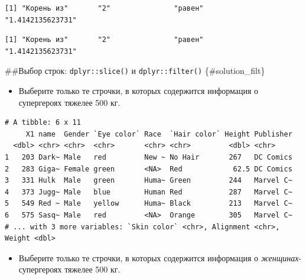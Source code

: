 \documentclass[
]{book}
\newenvironment{Shaded}{\begin{snugshade}}{\end{snugshade}}
\newcommand{\DecValTok}[1]{\textcolor[rgb]{0.00,0.00,0.81}{#1}}
\newcommand{\KeywordTok}[1]{\textcolor[rgb]{0.13,0.29,0.53}{\textbf{#1}}}
\newcommand{\NormalTok}[1]{#1}
\newcommand{\OperatorTok}[1]{\textcolor[rgb]{0.81,0.36,0.00}{\textbf{#1}}}
\newcommand{\StringTok}[1]{\textcolor[rgb]{0.31,0.60,0.02}{#1}}
\providecommand{\tightlist}{%
  \setlength{\itemsep}{0pt}\setlength{\parskip}{0pt}}
\begin{document}
\begin{verbatim}
[1] "Корень из"       "2"               "равен"           "1.4142135623731"
\end{verbatim}

\begin{Shaded}
\end{Shaded}

\begin{verbatim}
[1] "Корень из"       "2"               "равен"           "1.4142135623731"
\end{verbatim}

\#\#Выбор строк: \texttt{dplyr::slice()} и \texttt{dplyr::filter()} \{\#solution\_filt\}

\begin{itemize}
\tightlist
\item
  Выберите только те строчки, в которых содержится информация о супергероях тяжелее 500 кг.
\end{itemize}

\begin{Shaded}
\end{Shaded}

\begin{verbatim}
# A tibble: 6 x 11
     X1 name  Gender `Eye color` Race  `Hair color` Height Publisher
  <dbl> <chr> <chr>  <chr>       <chr> <chr>         <dbl> <chr>    
1   203 Dark~ Male   red         New ~ No Hair       267   DC Comics
2   283 Giga~ Female green       <NA>  Red            62.5 DC Comics
3   331 Hulk  Male   green       Huma~ Green         244   Marvel C~
4   373 Jugg~ Male   blue        Human Red           287   Marvel C~
5   549 Red ~ Male   yellow      Huma~ Black         213   Marvel C~
6   575 Sasq~ Male   red         <NA>  Orange        305   Marvel C~
# ... with 3 more variables: `Skin color` <chr>, Alignment <chr>, Weight <dbl>
\end{verbatim}

\begin{itemize}
\tightlist
\item
  Выберите только те строчки, в которых содержится информация о \emph{женщинах}-супергероях тяжелее 500 кг.
\end{itemize}
\end{document}
